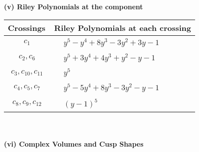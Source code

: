 \documentclass[1p]{elsarticle_modified}
\theoremstyle{definition}
\begin{document}
\newpage\renewcommand{\arraystretch}{1}
\flushleft \textbf{(v) Riley Polynomials at the component}\newline \\
\begin{tabular}{m{50pt}|m{274pt}}
Crossings & \hspace{64pt}Riley Polynomials at each crossing \\
\hline $$\begin{aligned}c_{1}\end{aligned}$$&$\begin{aligned}
&y^5- y^4+8 y^3-3 y^2+3 y-1
\end{aligned}$\\
\hline $$\begin{aligned}c_{2},c_{6}\end{aligned}$$&$\begin{aligned}
&y^5+3 y^4+4 y^3+y^2- y-1
\end{aligned}$\\
\hline $$\begin{aligned}c_{3},c_{10},c_{11}\end{aligned}$$&$\begin{aligned}
&y^5
\end{aligned}$\\
\hline $$\begin{aligned}c_{4},c_{5},c_{7}\end{aligned}$$&$\begin{aligned}
&y^5-5 y^4+8 y^3-3 y^2- y-1
\end{aligned}$\\
\hline $$\begin{aligned}c_{8},c_{9},c_{12}\end{aligned}$$&$\begin{aligned}
&(y-1)^5
\end{aligned}$\\
\hline
\end{tabular}\\~\\
\newpage\flushleft \textbf{(vi) Complex Volumes and Cusp Shapes}
\end{document}
